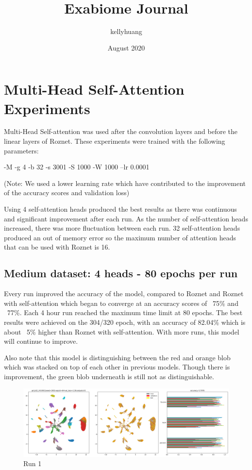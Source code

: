 \documentclass{article}
\title{Exabiome Journal}
\author{kellyhuang }
\date{August 2020}
\begin{document}
\maketitle

\section{Multi-Head Self-Attention Experiments}

Multi-Head Self-attention was used after the convolution layers and before the linear layers of Roznet. These experiments were trained with the following parameters: 

-M -g 4 -b 32 -s 3001 -S 1000 -W 1000 --lr 0.0001

(Note: We used a lower learning rate which have contributed to the improvement of the accuracy scores and validation loss)

Using 4 self-attention heads produced the best results as there was continuous and significant improvement after each run. As the number of self-attention heads increased, there was more fluctuation between each run. 32 self-attention heads produced an out of memory error so the maximum number of attention heads that can be used with Roznet is 16. 


\subsection*{Medium dataset: 4 heads - 80 epochs per run}
Every run improved the accuracy of the model, compared to Roznet and Roznet with self-attention which began to converge at an accuracy scores of ~75\% and ~77\%. Each 4 hour run reached the maximum time limit at 80 epochs. The best results were achieved on the 304/320 epoch, with an accuracy of 82.04\% which is about ~5\% higher than Roznet with self-attention. With more runs, this model will continue to improve. 

Also note that this model is distinguishing between the red and orange blob which was stacked on top of each other in previous models. Though there is improvement, the green blob underneath is still not as distinguishable. 

\begin{figure}[h!]
  \includegraphics[width=\linewidth]{new_journal/figures/experiments/roznet_multi/4_heads/run1.png}
  \caption{Run 1}
\end{figure}
\end{document}
